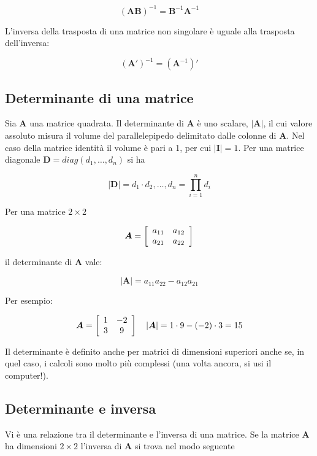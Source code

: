 \documentclass[
  11pt,
]{krantz}
\theoremstyle{definition}
\theoremstyle{definition}
\theoremstyle{definition}
\theoremstyle{definition}
\theoremstyle{remark}
\begin{document}
\[(\boldsymbol{AB})^{-1}=\boldsymbol{B}^{-1}\boldsymbol{A}^{-1}\]

L'inversa della trasposta di una matrice non singolare è uguale alla trasposta dell'inversa:

\[(\boldsymbol{A}')^{-1}=(\boldsymbol{A}^{-1})'\]

\hypertarget{determinante-di-una-matrice}{%
\subsection{Determinante di una matrice}\label{determinante-di-una-matrice}}

Sia \(\boldsymbol{A}\) una matrice quadrata. Il determinante di \(\boldsymbol{A}\) è uno scalare, \(|\boldsymbol{A}|\), il cui valore assoluto misura il volume del parallelepipedo delimitato dalle colonne di \(\boldsymbol{A}\). Nel caso della matrice identità il volume è pari a 1, per cui \(|\boldsymbol{I}| =1\). Per una matrice diagonale \(\boldsymbol{D} = diag(d_1, \dots, d_n)\) si ha

\[|\boldsymbol{D}| =  d_1 \cdot d_2, \dots, d_n = \prod_{i=1}^{n}d_i\]

Per una matrice \(2 \times 2\)

\[\boldsymbol{A} =  \left[ \begin{array}{c c}
a_{11}& a_{12} \\
a_{21} & a_{22} \end{array} \right]\]

il determinante di \(\boldsymbol{A}\) vale:

\[|\boldsymbol{A}| =  a_{11}a_{22}-a_{12}a_{21}\]

Per esempio:

\[\boldsymbol{A} = \left[ \begin{array}{c c}
1 & -2 \\
3 & 9
\end{array}
 \right] \quad |\boldsymbol{A}| = 1\cdot 9 - (-2) \cdot  3 = 15\]

Il determinante è definito anche per matrici di dimensioni superiori anche se, in quel caso, i calcoli sono molto più complessi (una volta ancora, si usi il computer!).

\hypertarget{determinante-e-inversa}{%
\subsection{Determinante e inversa}\label{determinante-e-inversa}}

Vi è una relazione tra il determinante e l'inversa di una matrice. Se la matrice \(\boldsymbol{A}\) ha dimensioni \(2 \times 2\) l'inversa di \(\boldsymbol{A}\) si trova nel modo seguente
\end{document}
